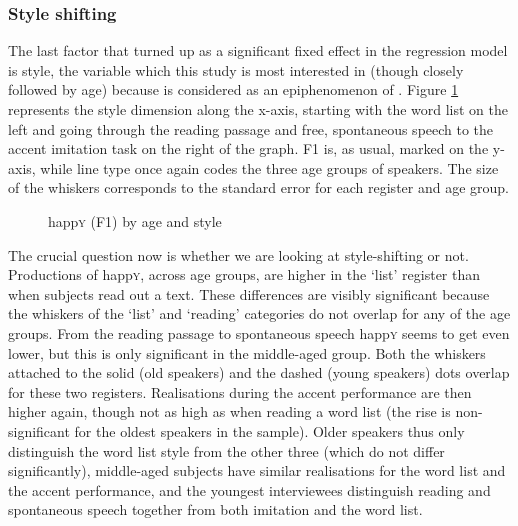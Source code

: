 \subsubsection{Style shifting}
\label{sec.prod.res.vow.happy.f1.shifting}

The last factor that turned up as a significant fixed effect in the regression model is style, the variable which this study is most interested in (though closely followed by age) because  is considered as an epiphenomenon of .
Figure \ref{fig.line.f1w.happy.tot} represents the style dimension along the x-axis, starting with the word list on the left and going through the reading passage and free, spontaneous speech to the accent imitation task on the right of the graph.
F1 is, as usual, marked on the y-axis, while line type once again codes the three age groups of speakers.
The size of the whiskers corresponds to the standard error for each register and age group.

\begin{figure}[h!]
	\centering
		\resizebox{0.5\linewidth}{!}{} 
	\caption{happ\textsc{y} (F1) by age and style}
	\label{fig.line.f1w.happy.tot}
\end{figure}

The crucial question now is whether we are looking at style-shifting or not.
Productions of happ\textsc{y}, across age groups, are higher in the `list' register than when subjects read out a text.
These differences are visibly significant because the whiskers of the `list' and `reading' categories do not overlap for any of the age groups.
From the reading passage to spontaneous speech happ\textsc{y} seems to get even lower, but this is only significant in the middle-aged group.
Both the whiskers attached to the solid (old speakers) and the dashed (young speakers) dots overlap for these two registers.
Realisations during the accent performance are then higher again, though not as high as when reading a word list (the rise is non-significant for the oldest speakers in the sample).
Older speakers thus only distinguish the word list style from the other three (which do not differ significantly), middle-aged subjects have similar realisations for the word list and the accent performance, and the youngest interviewees distinguish reading and spontaneous speech together from both imitation and the word list.

